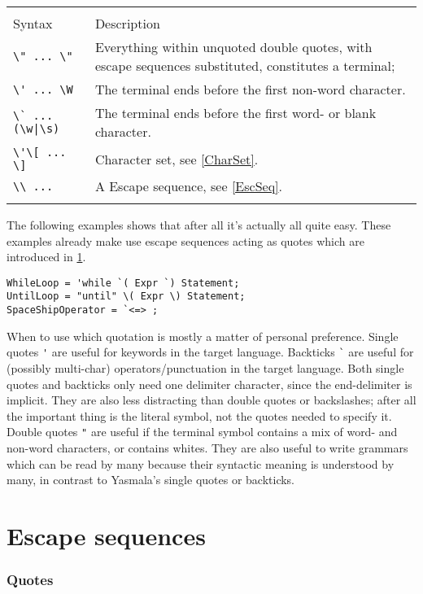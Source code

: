 \documentclass[a4paper]{report}
\begin{document}
\begin{tabular}{p{2.5cm}p{8.5cm}}
 & \\
Syntax            & Description  \\
\verb+\" ... \"+  & Everything within unquoted double quotes, with escape sequences substituted, constitutes a terminal; \\
\verb+\' ... \W+  & The terminal ends before the first non-word character. \\
\verb+\` ... (\w|\s)+  & The terminal ends before the first word- or blank character. \\
\verb+\'\[ ... \]+& Character set, see \ref{CharSet}. \\
\verb+\\ ...+     & A Escape sequence, see \ref{EscSeq}. \\
 & \\
\end{tabular}

The following examples shows that after all it's actually all quite easy.
These examples already make use escape sequences acting as quotes which are
introduced in \ref{EscSeqQuotes}.

\begin{verbatim}
WhileLoop = 'while `( Expr `) Statement;
UntilLoop = "until" \( Expr \) Statement;
SpaceShipOperator = `<=> ;
\end{verbatim}

When to use which quotation is mostly a matter of personal preference. Single
quotes \verb|'| are useful for keywords in the target language.
Backticks \verb|`| are useful for (possibly multi-char) operators/punctuation
in the target language. Both single quotes and backticks only need one
delimiter character, since the end-delimiter is implicit. They are also less
distracting than double quotes or backslashes; after all the important thing is
the literal symbol, not the quotes needed to specify it. Double quotes \verb|"|
are useful if the terminal symbol contains a mix of word-
and non-word characters, or contains whites. They are also useful to write
grammars which can be read by many because their syntactic
meaning is understood by many, in contrast to Yasmala's single quotes or
backticks. 

\label{EscSeq}
\section{Escape sequences}

\label{EscSeqQuotes}
\subsubsection{Quotes}
\end{document}
